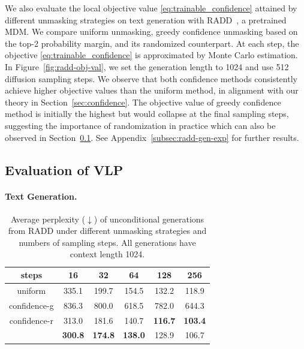 We also evaluate the local objective value \eqref{eq:trainable_confidence} attained by different unmasking strategies on text generation with RADD~\citep{ou2024your}, a pretrained MDM. We compare uniform unmasking, greedy confidence unmasking based on the top-2 probability margin, and its randomized counterpart. At each step, the objective \eqref{eq:trainable_confidence} is approximated by Monte Carlo estimation. In Figure~\ref{fig:radd-obj-val}, we set the generation length to 1024 and use 512 diffusion sampling steps. We observe that both confidence methods consistently achieve higher objective values than the uniform method, in alignment with our theory in Section~\ref{sec:confidence}. The objective value of greedy confidence method is initially the highest but would collapse at the final sampling steps, suggesting the importance of randomization in practice which can also be observed in Section~\ref{subsec:vlp-eval}. See Appendix~\ref{subsec:radd-gen-exp} for further results.

\subsection{Evaluation of VLP}\label{subsec:vlp-eval}

\paragraph{Text Generation.}


\begin{table}
\caption{Average perplexity ($\downarrow$) of unconditional generations from RADD under different unmasking strategies and numbers of sampling steps. All generations have context length 1024.}
\centering
\small
\begin{tabular}{cccccc}
\toprule
steps & 16 & 32 & 64 & 128 & 256 \\
\midrule
uniform
& 335.1
& 199.7
& 154.5
& 132.2
& 118.9 \\
confidence-g
& 836.3
& 800.0
& 618.5
& 782.0
& 644.3 \\
confidence-r
& 313.0
& 181.6
& 140.7
& \textbf{116.7}
& \textbf{103.4} \\
\midrule
\cellcolor{lightblue}\alg{}
& \cellcolor{bestgreen}\textbf{300.8}
& \cellcolor{bestgreen}\textbf{174.8}
& \cellcolor{bestgreen}\textbf{138.0}
& \cellcolor{lightblue}128.9
& \cellcolor{lightblue}106.7 \\
\bottomrule
\end{tabular}
\label{tab:text-gen}
\end{table}

